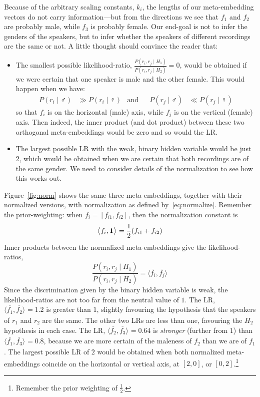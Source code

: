 \documentclass[a4paper,oneside,12pt,english]{report}
\def\expv#1#2{\bigl\langle#1\bigr\rangle_{#2}}
\def\dot#1#2{\expv{#1,#2}{}}
\def\normal#1{\overline{#1}}
\begin{document}
Because of the arbitrary scaling constants, $k_i$, the lengths of our meta-embedding vectors do not carry information---but from the directions we see that $f_1$ and $f_2$ are probably male, while $f_3$ is probably female. Our end-goal is not to infer the genders of the speakers, but to infer whether the speakers of different recordings are the same or not. A little thought should convince the reader that: 
\begin{itemize}
	\item The smallest possible likelihood-ratio, $\frac{P(r_i,r_j\mid H_1)}{P(r_i,r_j\mid H_2)}=0$, would be obtained if we were certain that one speaker is male and the other female. This would happen when we have: 
\begin{align*}
P(r_i\mid\male) &\gg P(r_i\mid\female) &\text{and} && P(r_j\mid\male) &\ll P(r_j\mid\female)
\end{align*}
so that $f_i$ is on the horizontal (male) axis, while $f_j$ is on the vertical (female) axis. Then indeed, the inner product (and dot product) between these two orthogonal meta-embeddings would be zero and so would the LR.
  \item The largest possible LR with the weak, binary hidden variable would be just $2$, which would be obtained when we are certain that both recordings are of the same gender. We need to consider details of the normalization to see how this works out.
\end{itemize}
Figure~\ref{fig:norm} shows the same three meta-embeddings, together with their normalized versions, with normalization as defined by~\eqref{eq:normalize}. Remember the prior-weighting: when $f_i=[f_{i1},f_{i2}]$, then the normalization constant is 
$$\dot{f_i}{\onevec}=\frac12(f_{i1}+f_{i2})$$
Inner products between the normalized meta-embeddings give the likelihood-ratios, 
$$\frac{P(r_i,r_j\mid H_1)}{P(r_i,r_j\mid H_2)}=\dot{\normal{f_i}}{\normal{f_j}}$$ 
Since the discrimination given by the binary hidden variable is weak, the likelihood-ratios are not too far from the neutral value of $1$. The LR, $\dot{\normal{f_1}}{\normal{f_2}}=1.2$ is greater than $1$, slightly favouring the hypothesis that the speakers of $r_1$ and $r_2$ are the same. The other two LRs are less than one, favouring the $H_2$ hypothesis in each case. The LR, $\dot{\normal{f_2}}{\normal{f_3}}=0.64$ is \emph{stronger} (further from $1$) than $\dot{\normal{f_1}}{\normal{f_3}}=0.8$, because we are more certain of the maleness of $f_2$ than we are of $f_1$. The largest possible LR of $2$ would be obtained when both normalized meta-embeddings coincide on the horizontal or vertical axis, at $[2,0]$, or $[0,2]$.\footnote{Remember the prior weighting of $\frac12$.}
\end{document}
